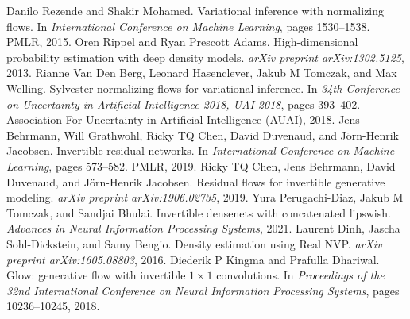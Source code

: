 \begin{chapterreferences}
 Danilo Rezende and Shakir Mohamed. Variational inference with normalizing flows. In \emph{International Conference on Machine Learning}, pages 1530--1538. PMLR, 2015.
 Oren Rippel and Ryan Prescott Adams. High-dimensional probability estimation with deep density models. \emph{arXiv preprint arXiv:1302.5125}, 2013.
 Rianne Van Den Berg, Leonard Hasenclever, Jakub M Tomczak, and Max Welling. Sylvester normalizing flows for variational inference. In \emph{34th Conference on Uncertainty in Artificial Intelligence 2018, UAI 2018}, pages 393--402. Association For Uncertainty in Artificial Intelligence (AUAI), 2018.
 Jens Behrmann, Will Grathwohl, Ricky TQ Chen, David Duvenaud, and Jörn-Henrik Jacobsen. Invertible residual networks. In \emph{International Conference on Machine Learning}, pages 573--582. PMLR, 2019.
 Ricky TQ Chen, Jens Behrmann, David Duvenaud, and Jörn-Henrik Jacobsen. Residual flows for invertible generative modeling. \emph{arXiv preprint arXiv:1906.02735}, 2019.
 Yura Perugachi-Diaz, Jakub M Tomczak, and Sandjai Bhulai. Invertible densenets with concatenated lipswish. \emph{Advances in Neural Information Processing Systems}, 2021.
 Laurent Dinh, Jascha Sohl-Dickstein, and Samy Bengio. Density estimation using Real NVP. \emph{arXiv preprint arXiv:1605.08803}, 2016.
 Diederik P Kingma and Prafulla Dhariwal. Glow: generative flow with invertible $1\times1$ convolutions. In \emph{Proceedings of the 32nd International Conference on Neural Information Processing Systems}, pages 10236--10245, 2018.


\end{chapterreferences}
